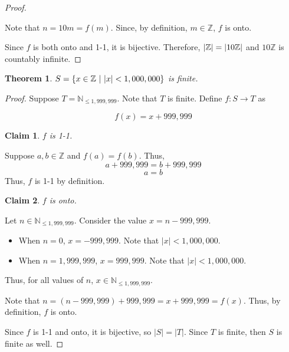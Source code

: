 \documentclass{article}
\DeclarePairedDelimiter\abs{\lvert}{\rvert}%
\newtheorem{theorem}{Theorem}
\newtheorem{claim}{Claim}[theorem]
\begin{document}
\begin{outline}[enumerate]
\begin{proof}
\begin{adjustwidth}{.5cm}{.5cm}
            Note that $n = 10m = f(m)$. Since, by definition, $m \in \mathbb{Z}$, $f$ is onto. 
        \end{adjustwidth}

        Since $f$ is both onto and 1-1, it is bijective. Therefore, $\abs{\mathbb{Z}} = \abs{10\mathbb{Z}}$ and $10\mathbb{Z}$ is countably infinite.
    \end{proof}

    \1 \begin{theorem}
        $S = \left\{x \in \mathbb{Z} \ \vert \ \abs{x} < 1,000,000 \right\}$ is finite.
    \end{theorem}
    \begin{proof}
        Suppose $T = \mathbb{N}_{\leq 1,999,999}$. Note that $T$ is finite. Define $f: S \rightarrow T$ as

        $$f(x) = x + 999,999$$

        \begin{claim}
            $f$ is 1-1.
        \end{claim}
        \begin{adjustwidth}{.5cm}{.5cm}
            Suppose $a, b \in \mathbb{Z}$ and $f(a) = f(b)$. Thus,
            $$a + 999,999 = b + 999,999$$
            $$a = b$$
            Thus, $f$ is 1-1 by definition.
        \end{adjustwidth}

        \begin{claim}
            $f$ is onto.
        \end{claim}
        \begin{adjustwidth}{.5cm}{.5cm}
            Let $n \in \mathbb{N}_{\leq 1,999,999}$. Consider the value $x = n - 999,999$. 
            \begin{itemize}
                \item When $n = 0$, $x = -999,999$. Note that $|x| < 1,000,000$.
                \item When $n = 1,999,999$, $x = 999,999$. Note that $|x| < 1,000,000$.
            \end{itemize}

            Thus, for all values of $n$, $x \in \mathbb{N}_{\leq 1,999,999}$. 

            Note that $n = (n - 999,999) + 999,999 = x + 999,999 = f(x)$. Thus, by definition, $f$ is onto. 
        \end{adjustwidth}

        Since $f$ is 1-1 and onto, it is bijective, so $|S| = |T|$. Since $T$ is finite, then $S$ is finite as well.
    \end{proof}


\end{outline}
\end{document}
